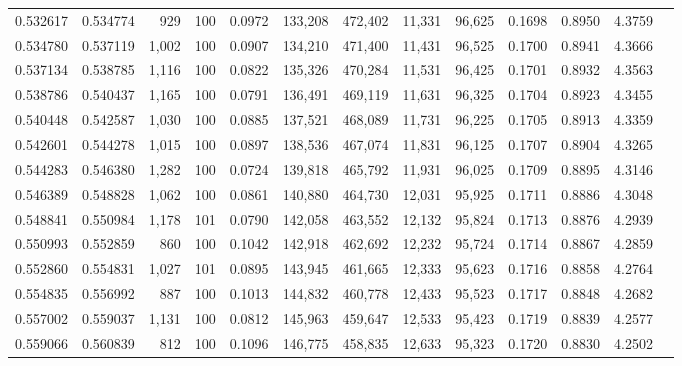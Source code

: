 \begin{tabular}{rrrrrrrrrrrrr}
0.532617 & 0.534774 &   929 & 100 &                                     0.0972 & 133,208 & 472,402 &  11,331 &  96,625 & 0.1698 & 0.8950 & 4.3759 \\
0.534780 & 0.537119 & 1,002 & 100 &                                     0.0907 & 134,210 & 471,400 &  11,431 &  96,525 & 0.1700 & 0.8941 & 4.3666 \\
0.537134 & 0.538785 & 1,116 & 100 &                                     0.0822 & 135,326 & 470,284 &  11,531 &  96,425 & 0.1701 & 0.8932 & 4.3563 \\
0.538786 & 0.540437 & 1,165 & 100 &                                     0.0791 & 136,491 & 469,119 &  11,631 &  96,325 & 0.1704 & 0.8923 & 4.3455 \\
0.540448 & 0.542587 & 1,030 & 100 &                                     0.0885 & 137,521 & 468,089 &  11,731 &  96,225 & 0.1705 & 0.8913 & 4.3359 \\
0.542601 & 0.544278 & 1,015 & 100 &                                     0.0897 & 138,536 & 467,074 &  11,831 &  96,125 & 0.1707 & 0.8904 & 4.3265 \\
0.544283 & 0.546380 & 1,282 & 100 &                                     0.0724 & 139,818 & 465,792 &  11,931 &  96,025 & 0.1709 & 0.8895 & 4.3146 \\
0.546389 & 0.548828 & 1,062 & 100 &                                     0.0861 & 140,880 & 464,730 &  12,031 &  95,925 & 0.1711 & 0.8886 & 4.3048 \\
0.548841 & 0.550984 & 1,178 & 101 &                                     0.0790 & 142,058 & 463,552 &  12,132 &  95,824 & 0.1713 & 0.8876 & 4.2939 \\
0.550993 & 0.552859 &   860 & 100 &                                     0.1042 & 142,918 & 462,692 &  12,232 &  95,724 & 0.1714 & 0.8867 & 4.2859 \\
0.552860 & 0.554831 & 1,027 & 101 &                                     0.0895 & 143,945 & 461,665 &  12,333 &  95,623 & 0.1716 & 0.8858 & 4.2764 \\
0.554835 & 0.556992 &   887 & 100 &                                     0.1013 & 144,832 & 460,778 &  12,433 &  95,523 & 0.1717 & 0.8848 & 4.2682 \\
0.557002 & 0.559037 & 1,131 & 100 &                                     0.0812 & 145,963 & 459,647 &  12,533 &  95,423 & 0.1719 & 0.8839 & 4.2577 \\
0.559066 & 0.560839 &   812 & 100 &                                     0.1096 & 146,775 & 458,835 &  12,633 &  95,323 & 0.1720 & 0.8830 & 4.2502 \\

\end{tabular}
